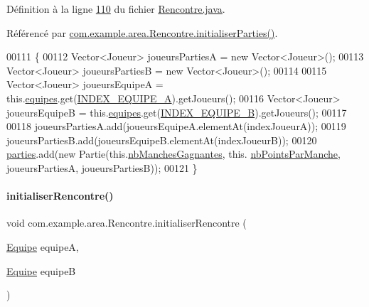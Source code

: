 Définition à la ligne \hyperlink{_rencontre_8java_source_l00110}{110} du fichier \hyperlink{_rencontre_8java_source}{Rencontre.\+java}.



Référencé par \hyperlink{_rencontre_8java_source_l00081}{com.\+example.\+area.\+Rencontre.\+initialiser\+Parties()}.


\begin{DoxyCode}
00111     \{
00112         Vector<Joueur> joueursPartiesA = \textcolor{keyword}{new} Vector<Joueur>();
00113         Vector<Joueur> joueursPartiesB = \textcolor{keyword}{new} Vector<Joueur>();
00114 
00115         Vector<Joueur> joueursEquipeA = this.\hyperlink{classcom_1_1example_1_1area_1_1_rencontre_accbafe5a878f457fb7119cfd55401c86}{equipes}.get(\hyperlink{classcom_1_1example_1_1area_1_1_rencontre_a673930c3156037739c3fa2aa335033d7}{INDEX\_EQUIPE\_A}).getJoueurs();
00116         Vector<Joueur> joueursEquipeB = this.\hyperlink{classcom_1_1example_1_1area_1_1_rencontre_accbafe5a878f457fb7119cfd55401c86}{equipes}.get(\hyperlink{classcom_1_1example_1_1area_1_1_rencontre_a08ed5cef8f2bbb80b2010bdb60c515d6}{INDEX\_EQUIPE\_B}).getJoueurs();
00117 
00118         joueursPartiesA.add(joueursEquipeA.elementAt(indexJoueurA));
00119         joueursPartiesB.add(joueursEquipeB.elementAt(indexJoueurB));
00120         \hyperlink{classcom_1_1example_1_1area_1_1_rencontre_a9bdc6df389184fc2ecb4d87a7879213a}{parties}.add(\textcolor{keyword}{new} Partie(this.\hyperlink{classcom_1_1example_1_1area_1_1_rencontre_aef266bd256aecd70fbd02cf07625ed14}{nbManchesGagnantes}, this.
      \hyperlink{classcom_1_1example_1_1area_1_1_rencontre_ae1849c4bcdcfbb2d336b750a36be1162}{nbPointsParManche}, joueursPartiesA, joueursPartiesB));
00121     \}
\end{DoxyCode}
\mbox{\label{classcom_1_1example_1_1area_1_1_rencontre_a61ff55a4fb128654aec0456d5b3adaa3}} 
\paragraph{\texorpdfstring{initialiser\+Rencontre()}{initialiserRencontre()}}
{\footnotesize\ttfamily void com.\+example.\+area.\+Rencontre.\+initialiser\+Rencontre (\begin{DoxyParamCaption}\item[{\hyperlink{classcom_1_1example_1_1area_1_1_equipe}{Equipe}}]{equipeA,  }\item[{\hyperlink{classcom_1_1example_1_1area_1_1_equipe}{Equipe}}]{equipeB }\end{DoxyParamCaption})\hspace{0.3cm}{\ttfamily [private]}}



